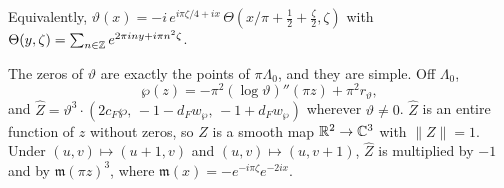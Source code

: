 Equivalently, $\vartheta(x)=-i\,e^{i\pi\zeta/4+ix}\,\Theta(x/\pi+\frac12+\frac\zeta2,\zeta)$ with $\Theta(y,\zeta)=\sum_{n\in\mathbb{Z}}e^{2\pi iny+i\pi n^2\zeta}$.

\begin{lemma}\label{lem:fer-theta}
The zeros of $\vartheta$ are exactly the points of $\pi\Lambda_0$, and they are simple. Off $\Lambda_0$,
\[
 \wp(z)=-\pi^2(\log\vartheta)''(\pi z)+\pi^2r_\vartheta ,
\]
and $\hat Z=\vartheta^3\cdot(2c_F\wp,\,-1-d_Fw_\wp,\,-1+d_Fw_\wp)$ wherever $\vartheta\ne0$. $\hat Z$ is an entire function
of $z$ without zeros, so $Z$ is a smooth map $\mathbb{R}^2\to\mathbb{C}^3$ with $\|Z\|=1$. Under $(u,v)\mapsto(u+1,v)$ and
$(u,v)\mapsto(u,v+1)$, $\hat Z$ is multiplied by $-1$ and by $\mathfrak m(\pi z)^3$, where
$\mathfrak m(x)=-e^{-i\pi\zeta}e^{-2ix}$.
\end{lemma}

